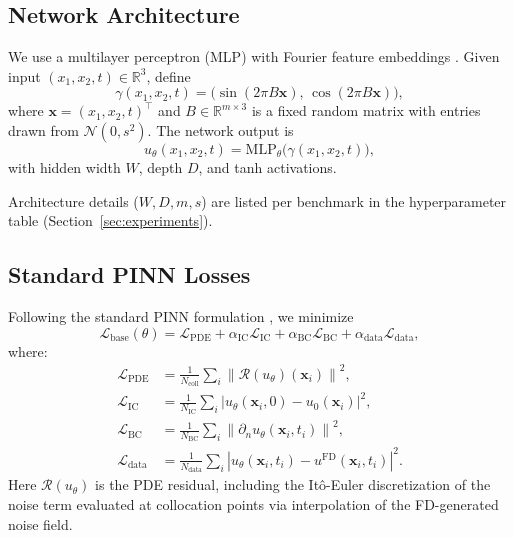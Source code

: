 \documentclass[times,12pt]{elsarticle}
\newcommand{\bbR}{\mathbb{R}}
\newcommand{\norm}[1]{\left\|#1\right\|}
\newcommand{\abs}[1]{\left|#1\right|}
\newcommand{\bd}{\partial}
\begin{document}
\subsection{Network Architecture}

We use a multilayer perceptron (MLP) with Fourier feature embeddings \cite{Tancik2020}. Given input $(x_1, x_2, t) \in \bbR^3$, define
\begin{equation}
\gamma(x_1, x_2, t) = \big( \sin(2\pi B \mathbf{x}),\, \cos(2\pi B \mathbf{x}) \big),
\end{equation}
where $\mathbf{x} = (x_1, x_2, t)^\top$ and $B \in \bbR^{m \times 3}$ is a fixed random matrix with entries drawn from $\mathcal{N}(0, s^2)$. The network output is
\begin{equation}
u_\theta(x_1, x_2, t) = \mathrm{MLP}_\theta\big(\gamma(x_1, x_2, t)\big),
\end{equation}
with hidden width $W$, depth $D$, and tanh activations.

Architecture details ($W, D, m, s$) are listed per benchmark in the
hyperparameter table (Section~\ref{sec:experiments}).

\subsection{Standard PINN Losses}

Following the standard PINN formulation \cite{Raissi2019}, we minimize
\begin{equation}
\mathcal{L}_{\text{base}}(\theta) = \mathcal{L}_{\text{PDE}} + \alpha_{\text{IC}}\mathcal{L}_{\text{IC}} + \alpha_{\text{BC}}\mathcal{L}_{\text{BC}} + \alpha_{\text{data}}\mathcal{L}_{\text{data}},
\end{equation}
where:
\begin{align*}
\mathcal{L}_{\text{PDE}} &= \tfrac{1}{N_{\text{coll}}} \sum_i \norm{\mathcal{R}(u_\theta)(\mathbf{x}_i)}^2, \\
\mathcal{L}_{\text{IC}} &= \tfrac{1}{N_{\text{IC}}} \sum_i \abs{u_\theta(\mathbf{x}_i, 0) - u_0(\mathbf{x}_i)}^2, \\
\mathcal{L}_{\text{BC}} &= \tfrac{1}{N_{\text{BC}}} \sum_i \norm{\bd_n u_\theta(\mathbf{x}_i, t_i)}^2, \\
\mathcal{L}_{\text{data}} &= \tfrac{1}{N_{\text{data}}} \sum_i \abs{u_\theta(\mathbf{x}_i, t_i) - u^{\text{FD}}(\mathbf{x}_i, t_i)}^2.
\end{align*}
Here $\mathcal{R}(u_\theta)$ is the PDE residual, including the Itô-Euler discretization of the noise term evaluated at collocation points via interpolation of the FD-generated noise field.
\end{document}
